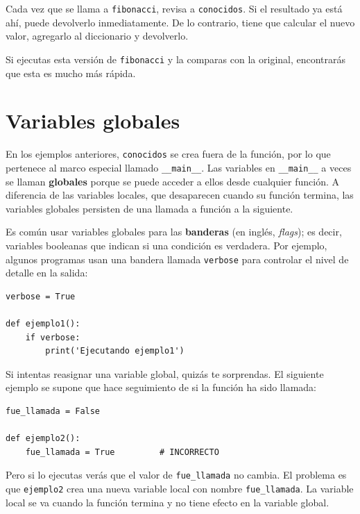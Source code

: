 \documentclass[10pt]{book}
\begin{document}
Cada vez que se llama a {\tt fibonacci}, revisa a {\tt conocidos}.
Si el resultado ya está ahí, puede devolverlo
inmediatamente.  De lo contrario, tiene que
calcular el nuevo valor, agregarlo al diccionario y devolverlo.

Si ejecutas esta versión de {\tt fibonacci} y la comparas con
la original, encontrarás que esta es mucho más rápida.



\section{Variables globales}

En los ejemplos anteriores, {\tt conocidos} se crea fuera de la función,
por lo que pertenece al marco especial llamado \verb"__main__".
Las variables en \verb"__main__" a veces se llaman {\bf globales}
porque se puede acceder a ellos desde cualquier función.  A diferencia de las variables
locales, que desaparecen cuando su función termina, las variables globales 
persisten de una llamada a función a la siguiente.

Es común usar variables globales para las {\bf banderas} (en inglés, {\em flags}); es decir,
variables booleanas que indican si una condición
es verdadera.  Por ejemplo, algunos programas usan
una bandera llamada {\tt verbose} para controlar el nivel de detalle en la
salida:

\begin{verbatim}
verbose = True

def ejemplo1():
    if verbose:
        print('Ejecutando ejemplo1')
\end{verbatim}
%
Si intentas reasignar una variable global, quizás te sorprendas.
El siguiente ejemplo se supone que hace seguimiento de si la
función ha sido llamada:

\begin{verbatim}
fue_llamada = False

def ejemplo2():
    fue_llamada = True         # INCORRECTO 
\end{verbatim} 
% 
Pero si lo ejecutas verás que el valor de \verb"fue_llamada"
no cambia. El problema es que {\tt ejemplo2} crea una nueva variable local
con nombre \verb"fue_llamada".  La variable local se va cuando 
la función termina y no tiene efecto en la variable global.
\end{document}
